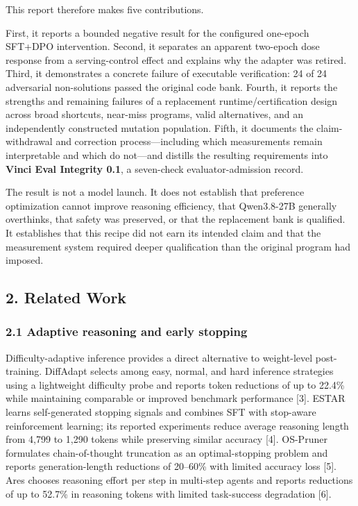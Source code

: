 \documentclass[
  9pt,
  letterpaper,
]{article}
\begin{document}
This report therefore makes five contributions.

First, it reports a bounded negative result for the configured one-epoch
SFT+DPO intervention. Second, it separates an apparent two-epoch dose
response from a serving-control effect and explains why the adapter was
retired. Third, it demonstrates a concrete failure of executable
verification: 24 of 24 adversarial non-solutions passed the original
code bank. Fourth, it reports the strengths and remaining failures of a
replacement runtime/certification design across broad shortcuts,
near-miss programs, valid alternatives, and an independently constructed
mutation population. Fifth, it documents the claim-withdrawal and
correction process---including which measurements remain interpretable
and which do not---and distills the resulting requirements into
\textbf{Vinci Eval Integrity 0.1}, a seven-check evaluator-admission
record.

The result is not a model launch. It does not establish that preference
optimization cannot improve reasoning efficiency, that Qwen3.8-27B
generally overthinks, that safety was preserved, or that the replacement
bank is qualified. It establishes that this recipe did not earn its
intended claim and that the measurement system required deeper
qualification than the original program had imposed.

\hypertarget{2-related-work}{%
\subsection{2. Related Work}\label{2-related-work}}

\hypertarget{21-adaptive-reasoning-and-early-stopping}{%
\subsubsection{2.1 Adaptive reasoning and early
stopping}\label{21-adaptive-reasoning-and-early-stopping}}

Difficulty-adaptive inference provides a direct alternative to
weight-level post-training. DiffAdapt selects among easy, normal, and
hard inference strategies using a lightweight difficulty probe and
reports token reductions of up to 22.4\% while maintaining comparable or
improved benchmark performance {[}3{]}. ESTAR learns self-generated
stopping signals and combines SFT with stop-aware reinforcement
learning; its reported experiments reduce average reasoning length from
4,799 to 1,290 tokens while preserving similar accuracy {[}4{]}.
OS-Pruner formulates chain-of-thought truncation as an optimal-stopping
problem and reports generation-length reductions of 20--60\% with
limited accuracy loss {[}5{]}. Ares chooses reasoning effort per step in
multi-step agents and reports reductions of up to 52.7\% in reasoning
tokens with limited task-success degradation {[}6{]}.
\end{document}
